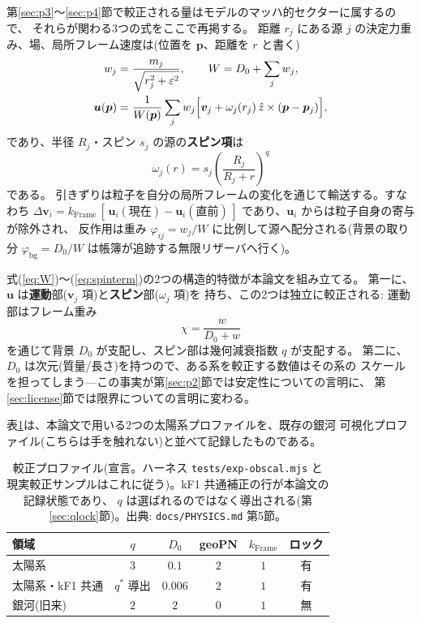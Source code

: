 \documentclass[a4paper,10pt,twocolumn]{ltjsarticle}
\begin{document}
第\ref{sec:p3}〜\ref{sec:p4}節で較正される量はモデルのマッハ的セクターに属するので、
それらが関わる3つの式をここで再掲する。
距離 $r_j$ にある源 $j$ の決定力重み、場、局所フレーム速度は(位置を $\bm p$、距離を $r$ と書く)
\begin{align}
  w_j &= \frac{m_j}{\sqrt{r_j^{2}+\varepsilon^{2}}},
  \qquad W = D_0+\sum_j w_j,
  \label{eq:W}\\
  \bm u(\bm p) &= \frac{1}{W(\bm p)}\sum_j w_j
   \Bigl[\bm v_j+\omega_j(r_j)\,\hat z\times(\bm p-\bm p_j)\Bigr],
  \label{eq:u}
\end{align}
であり、半径 $R_j$・スピン $s_j$ の源の\textbf{スピン項}は
\begin{equation}
  \omega_j(r) = s_j\left(\frac{R_j}{R_j+r}\right)^{q}
  \label{eq:spinterm}
\end{equation}
である。
引きずりは粒子を自分の局所フレームの変化を通じて輸送する。すなわち
$\Delta\bm v_i = k_{\mathrm{Frame}}\,[\,\bm u_i(\text{現在})-
\bm u_i(\text{直前})\,]$ であり、$\bm u_i$ からは粒子自身の寄与が除外され、
反作用は重み $\varphi_{ij}=w_j/W$ に比例して源へ配分される(背景の取り分
$\varphi_{\mathrm{bg}}=D_0/W$ は帳簿が追跡する無限リザーバへ行く)。

式(\ref{eq:W})〜(\ref{eq:spinterm})の2つの構造的特徴が本論文を組み立てる。
第一に、$\bm u$ は\textbf{運動}部($\bm v_j$ 項)と\textbf{スピン}部($\omega_j$ 項)を
持ち、この2つは独立に較正される: 運動部はフレーム重み
\begin{equation}
  \chi = \frac{w}{D_0+w}
  \label{eq:chi}
\end{equation}
を通じて背景 $D_0$ が支配し、スピン部は幾何減衰指数 $q$ が支配する。
第二に、$D_0$ は次元(質量/長さ)を持つので、ある系を較正する数値はその系の
スケールを担ってしまう---この事実が第\ref{sec:p2}節では安定性についての言明に、
第\ref{sec:license}節では限界についての言明に変わる。

表\ref{tab:profiles}は、本論文で用いる2つの太陽系プロファイルを、既存の銀河
可視化プロファイル(こちらは手を触れない)と並べて記録したものである。

\begin{table}[t]
\centering
\caption{較正プロファイル(宣言。ハーネス \texttt{tests/exp-obscal.mjs} と
  現実較正サンプルはこれに従う)。kF1 共通補正の行が本論文の記録状態であり、
  $q$ は選ばれるのではなく導出される(第\ref{sec:qlock}節)。出典:
  \texttt{docs/PHYSICS.md} 第5節。}
\label{tab:profiles}
\begin{tabular}{lccccc}
\toprule
領域 & $q$ & $D_0$ & geoPN & $k_{\mathrm{Frame}}$ & ロック \\
\midrule
太陽系 & $3$ & $0.1$ & $2$ & $1$ & 有 \\
太陽系・kF1 共通 & $q^{*}$ 導出 & $0.006$ & $2$ & $1$ & 有 \\
銀河(旧来) & $2$ & $2$ & $0$ & $1$ & 無 \\
\bottomrule
\end{tabular}
\end{table}
\end{document}
